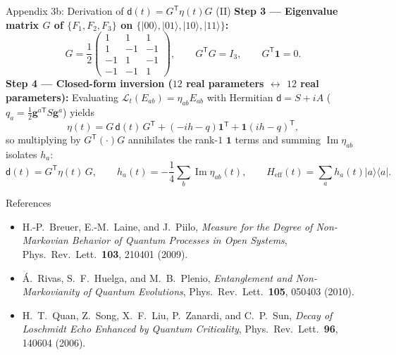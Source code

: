 \documentclass[aspectratio=169,11pt]{beamer}
\newcommand{\ket}[1]{\lvert #1\rangle}
\newcommand{\bra}[1]{\langle #1\rvert}
\newcommand{\dmat}{\mathsf d}
\newcommand{\Heff}{H_{\mathrm{eff}}}
\begin{document}
\begin{frame}{Appendix 3b: Derivation of $\dmat(t)=G^{\mathsf T}\eta(t)G$ (II)}
\small
\textbf{Step 3 --- Eigenvalue matrix $G$ of $\{F_1,F_2,F_3\}$ on $\{\ket{00},\ket{01},\ket{10},\ket{11}\}$:}
\[
G=\frac12\begin{pmatrix}1&1&1\\1&-1&-1\\-1&1&-1\\-1&-1&1\end{pmatrix},\qquad
G^{\mathsf T}G=I_3,\qquad G^{\mathsf T}\mathbf1=0.
\]
\textbf{Step 4 --- Closed-form inversion ($12$ real parameters $\leftrightarrow$ $12$ real parameters):}
Evaluating $\mathcal L_t(E_{ab})=\eta_{ab}E_{ab}$ with Hermitian $\dmat=S+iA$ ($q_a=\tfrac12\mathbf g^{a\mathsf T}S\mathbf g^a$) yields
\[
\eta(t)=G\,\dmat(t)\,G^{\mathsf T}+(-ih-q)\mathbf1^{\mathsf T}+\mathbf1(ih-q)^{\mathsf T},
\]
so multiplying by $G^{\mathsf T}(\cdot)G$ annihilates the rank-$1$ $\mathbf1$ terms and summing $\operatorname{Im}\eta_{ab}$ isolates $h_a$:
\[
\boxed{\dmat(t)=G^{\mathsf T}\eta(t)\,G,\qquad
h_a(t)=-\frac14\sum_{b}\operatorname{Im}\eta_{ab}(t),\qquad
\Heff(t)=\sum_a h_a(t)\ket a\bra a .}
\]
\end{frame}

\begin{frame}{References}
\footnotesize
\nocite{Hall2014,Wootters1998}


\medskip
\begin{itemize}\footnotesize\setlength\itemsep{4pt}
\item H.-P.\ Breuer, E.-M.\ Laine, and J.\ Piilo, \emph{Measure for the Degree of Non-Markovian Behavior of Quantum Processes in Open Systems}, Phys.\ Rev.\ Lett.\ \textbf{103}, 210401 (2009).
\item \'A.\ Rivas, S.\ F.\ Huelga, and M.\ B.\ Plenio, \emph{Entanglement and Non-Markovianity of Quantum Evolutions}, Phys.\ Rev.\ Lett.\ \textbf{105}, 050403 (2010).
\item H.\ T.\ Quan, Z.\ Song, X.\ F.\ Liu, P.\ Zanardi, and C.\ P.\ Sun, \emph{Decay of Loschmidt Echo Enhanced by Quantum Criticality}, Phys.\ Rev.\ Lett.\ \textbf{96}, 140604 (2006).
\end{itemize}
\end{frame}
\end{document}
